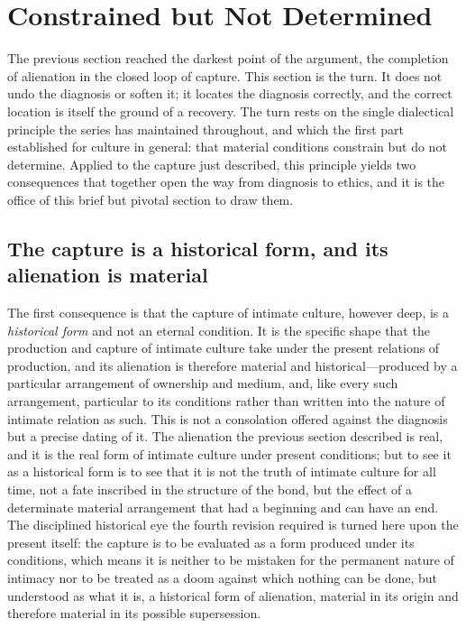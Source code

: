 \section{Constrained but Not Determined}
\label{p24:sec:constraint}

\noindent
The previous section reached the darkest point of the argument, the completion of alienation in the closed loop of capture. This section is the turn. It does not undo the diagnosis or soften it; it locates the diagnosis correctly, and the correct location is itself the ground of a recovery. The turn rests on the single dialectical principle the series has maintained throughout, and which the first part established for culture in general: that material conditions constrain but do not determine. Applied to the capture just described, this principle yields two consequences that together open the way from diagnosis to ethics, and it is the office of this brief but pivotal section to draw them.

\subsection*{The capture is a historical form, and its alienation is material}

The first consequence is that the capture of intimate culture, however deep, is a \emph{historical form} and not an eternal condition. It is the specific shape that the production and capture of intimate culture take under the present relations of production, and its alienation is therefore material and historical---produced by a particular arrangement of ownership and medium, and, like every such arrangement, particular to its conditions rather than written into the nature of intimate relation as such. This is not a consolation offered against the diagnosis but a precise dating of it. The alienation the previous section described is real, and it is the real form of intimate culture under present conditions; but to see it as a historical form is to see that it is not the truth of intimate culture for all time, not a fate inscribed in the structure of the bond, but the effect of a determinate material arrangement that had a beginning and can have an end. The disciplined historical eye the fourth revision required is turned here upon the present itself: the capture is to be evaluated as a form produced under its conditions, which means it is neither to be mistaken for the permanent nature of intimacy nor to be treated as a doom against which nothing can be done, but understood as what it is, a historical form of alienation, material in its origin and therefore material in its possible supersession.

